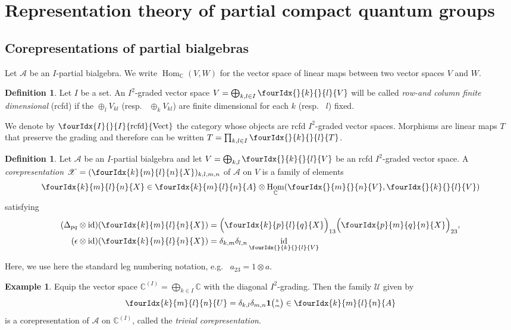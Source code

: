 \documentclass[10pt]{article}
\DeclareMathOperator{\id}{id}
\DeclareMathOperator{\Hom}{Hom}
\DeclareMathOperator{\rcf}{\mathrm{rcfd}}
\newcommand{\C}{\mathbb{C}}
\newcommand{\Vectrcf}{\Gr{\mathrm{Vect}}{I}{I}{}{\rcf}}
\newcommand{\Grt}[3]{#1{\tiny {\begin{pmatrix} #2\\#3\end{pmatrix}}}}
\newcommand{\UnitC}[2]{\Grt{\mathbf{1}}{#1}{#2}}
\newcommand{\Gr}[5]{\fourIdx{#2}{#4}{#3}{#5}{#1}}%
\newcommand{\Gru}[3]{\Gr{#1}{}{}{#2}{#3}}
\theoremstyle{definition}
\newtheorem{Def}[Theorem]{Definition}
\newtheorem{Exa}[Theorem]{Example}
\numberwithin{equation}{section}
\begin{document}

\section{Representation theory of partial compact quantum groups}

\subsection{Corepresentations of partial bialgebras}

Let $\mathscr{A}$ be an $I$-partial bialgebra. We write
$\Hom_\C(V,W)$ for the vector space of linear maps between two vector
spaces $V$ and $W$.


\begin{Def} Let $I$ be a set. An $I^{2}$-graded vector space $V=\bigoplus_{k,l\in I} \Gru{V}{k}{l}$ will be called \emph{row-and column finite dimensional} (rcfd) if the $\oplus_l V_{kl}$ (resp.~ $\oplus_k V_{kl}$) are finite dimensional for each $k$ (resp.~ $l$) fixed. 

We denote by  $\Vectrcf$ the category whose objects are rcfd $I^{2}$-graded vector spaces. Morphisms are linear maps $T$ that preserve the grading and therefore
can be written $T=\prod_{k,l\in I} \Gru{T}{k}{l}$. 
\end{Def} 

\begin{Def} \label{definition:corep} Let $\mathscr{A}$ be an
  $I$-partial bialgebra and let $V=\bigoplus_{k,l} \Gru{V}{k}{l}$
   be
an rcfd $I^{2}$-graded vector space.  A \emph{corepresentation}
  $\mathscr{X}=(\Gr{X}{k}{l}{m}{n})_{k,l,m,n}$ of $\mathscr{A}$ on $V$
  is a family of elements
 \begin{align} \label{eq:rep-blocks}
   \Gr{X}{k}{l}{m}{n} \in \Gr{A}{k}{l}{m}{n} \otimes
  \Hom_\C(\Gru{V}{m}{n},\Gru{V}{k}{l})
 \end{align}
 satisfying 
 \begin{align}
   \label{eq:rep-comultiplication}
    (\Delta_{pq} \otimes
    \id)(\Gr{X}{k}{l}{m}{n}) &=
    \Big{(}\Gr{X}{k}{l}{p}{q}\Big{)}_{13}\Big{(}\Gr{X}{p}{q}{m}{n}\Big{)}_{23},
    \\ \label{eq:rep-counit}
(\epsilon \otimes
  \id)(\Gr{X}{k}{l}{m}{n})&=\delta_{k,m}\delta_{l,n}\id_{\Gru{V}{k}{l}}
 \end{align}
\end{Def}
Here, we use here the standard leg numbering notation, e.g.~ $a_{23}=1\otimes a$.
\begin{Exa} \label{example:rep-triv} Equip the vector space
  $\C^{(I)}=\bigoplus_{k\in I} \C$ with the diagonal
  $I^{2}$-grading. Then the family $\mathscr{U}$ given by
  \begin{align} \label{eq:rep-triv}
    \Gr{U}{k}{l}{m}{n} = \delta_{k,l}\delta_{m,n} \UnitC{k}{m} \in
    \Gr{A}{k}{l}{m}{n}
  \end{align}
is a corepresentation of $\mathscr{A}$ on $\C^{(I)}$, called the
\emph{trivial corepresentation}.
\end{Exa}
\end{document}
